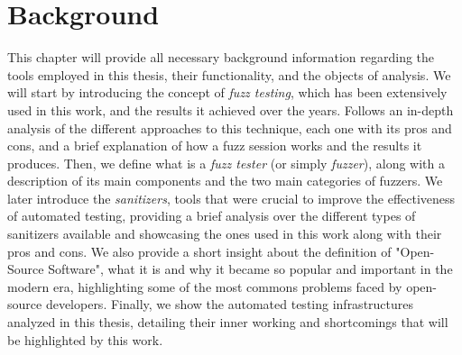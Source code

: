 \chapter{Background} \label{chap_2}

 \newline

This chapter will provide all necessary background information regarding the tools employed in this thesis, their functionality, and the objects of analysis.
\newline \newline
We will start by introducing the concept of \textit{fuzz testing}, which has been extensively used in this work, and the results it achieved over the years. 
\newline
Follows an in-depth analysis of the different approaches to this technique, each one with its pros and cons, and a brief explanation of how a fuzz session works and the results it produces.
\newline \newline
Then, we define what is a \textit{fuzz tester} (or simply \textit{fuzzer}), along with a description of its main components and the two main categories of fuzzers.
\newline \newline
We later introduce the \textit{sanitizers}, tools that were crucial to improve the effectiveness of automated testing, providing a brief analysis over the different types of sanitizers available and showcasing the ones used in this work along with their pros and cons.  
\newline \newline
We also provide a short insight about the definition of "Open-Source Software", what it is and why it became so popular and important in the modern era, highlighting some of the most commons problems faced by open-source developers.
\newline \newline
Finally, we show the automated testing infrastructures analyzed in this thesis, detailing their inner working and shortcomings that will be highlighted by this work.
\newline \newline
{}





